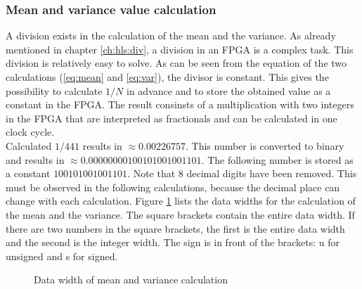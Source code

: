 \subsubsection*{Mean and variance value calculation}
A division exists in the calculation of the mean and the variance. As already mentioned in chapter \ref{ch:hls:div}, a division in an FPGA is a complex task.
This division is relatively easy to solve. As can be seen from the equation of
the two calculations (\ref{eq:mean} and \ref{eq:var}), the divisor is constant.
This gives the possibility to calculate $1/N$ in advance and to store the
obtained value as a constant in the FPGA. The result consinsts of a multiplication with
two integers in the FPGA that are interpreted as fractionals and can be
calculated in one clock cycle. \\
Calculated $1/441$ results in $\approx 0.00226757$. This number is converted to
binary and results in $\approx 0.00000000100101001001101$. The following number
is stored as a constant $100101001001101$. Note that 8 decimal digits have been
removed. This must be observed in the following calculations, because the
decimal place can change with each calculation. Figure \ref{fig:data_mean_var}
lists the data widths for the calculation of the mean and the variance. The
square brackets contain the entire data width. If there are two numbers in the
square brackets, the first is the entire data width and the second is the
integer width. The sign is in front of the brackets: u for unsigned and s for
signed.

\begin{figure}[tb!]
    \centering
    \begin{adjustbox}{max width=\textwidth, keepaspectratio}
        
    \end{adjustbox}
    \caption{Data width of mean and variance calculation}
    \label{fig:data_mean_var}
\end{figure}

